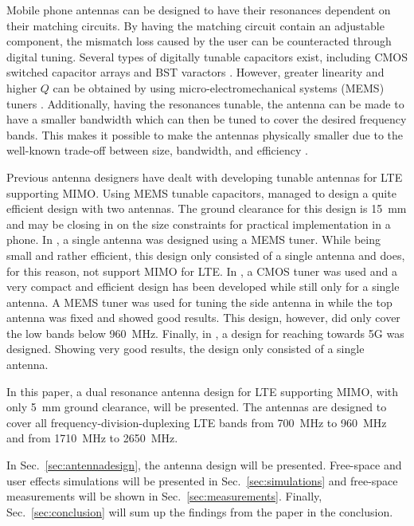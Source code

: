 Mobile phone antennas can be designed to have their resonances dependent on their matching circuits. By having the matching circuit contain an adjustable component, the mismatch loss caused by the user can be counteracted through digital tuning. Several types of digitally tunable capacitors exist, including CMOS switched capacitor arrays and BST varactors \cite{gu2014rf}. However, greater linearity and higher $Q$ can be obtained by using micro-electromechanical systems (MEMS) tuners \cite{gu2014rf}. Additionally, having the resonances tunable, the antenna can be made to have a smaller bandwidth which can then be tuned to cover the desired frequency bands. This makes it possible to make the antennas physically smaller due to the well-known trade-off between size, bandwidth, and efficiency \cite{hilbert2015tradeoff}.

Previous antenna designers have dealt with developing tunable antennas for LTE supporting MIMO. Using MEMS tunable capacitors, \cite{ilvonen2014multiband} managed to design a quite efficient design with two antennas. The ground clearance for this design is \SI{15}{mm} and may be closing in on the size constraints for practical implementation in a phone. In \cite{morris2014tunable}, a single antenna was designed using a MEMS tuner. While being small and rather efficient, this design only consisted of a single antenna and does, for this reason, not support MIMO for LTE. In \cite{xia2015compact}, a CMOS tuner was used and a very compact and efficient design has been developed while still only for a single antenna. A MEMS tuner was used for tuning the side antenna in \cite{tatomirescu2015alternative} while the top antenna was fixed and showed good results. This design, however, did only cover the low bands below \SI{960}{MHz}. Finally, in \cite{trinh2016reconfigurable}, a design for reaching towards 5G was designed. Showing very good results, the design only consisted of a single antenna.

In this paper, a dual resonance antenna design for LTE supporting MIMO, with only \SI{5}{mm} ground clearance, will be presented. The antennas are designed to cover all frequency-division-duplexing LTE bands from \SI{700}{MHz} to \SI{960}{MHz} and from \SI{1710}{MHz} to \SI{2650}{MHz}.

In Sec.~\ref{sec:antennadesign}, the antenna design will be presented. Free-space and user effects simulations will be presented in Sec.~\ref{sec:simulations} and free-space measurements will be shown in Sec.~\ref{sec:measurements}. Finally, Sec.~\ref{sec:conclusion} will sum up the findings from the paper in the conclusion.

